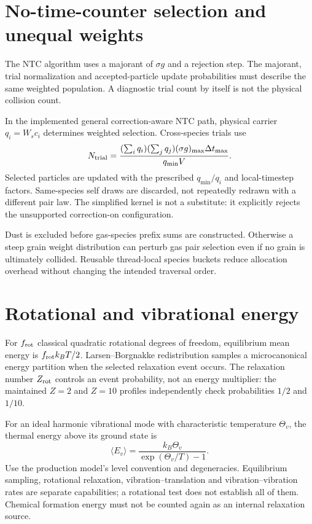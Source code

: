 \section{No-time-counter selection and unequal weights}
The NTC algorithm uses a majorant of $\sigma g$ and a rejection step.
The majorant, trial normalization and accepted-particle update probabilities
must describe the same weighted population. A diagnostic trial count by
itself is not the physical collision count.

In the implemented general correction-aware NTC path, physical carrier
$q_i=W_s c_i$ determines weighted selection. Cross-species trials use
\begin{equation}
N_{\rm trial}=\frac{(\sum_iq_i)(\sum_jq_j)
(\sigma g)_{\max}\Delta t_{\max}}{q_{\min}V}.
\end{equation}
Selected particles are updated with the prescribed $q_{\min}/q_i$ and
local-timestep factors. Same-species self draws are discarded, not repeatedly
redrawn with a different pair law. The simplified kernel is not a substitute:
it explicitly rejects the unsupported correction-on configuration.

Dust is excluded before gas-species prefix sums are constructed. Otherwise a
steep grain weight distribution can perturb gas pair selection even if no
grain is ultimately collided. Reusable thread-local species buckets reduce
allocation overhead without changing the intended traversal order.

\section{Rotational and vibrational energy}
For $f_{\rm rot}$ classical quadratic rotational degrees of freedom, equilibrium
mean energy is $f_{\rm rot}k_BT/2$. Larsen--Borgnakke redistribution samples a
microcanonical energy partition when the selected relaxation event occurs.
The relaxation number $Z_{\rm rot}$ controls an event probability, not an
energy multiplier: the maintained $Z=2$ and $Z=10$ profiles independently
check probabilities $1/2$ and $1/10$.

For an ideal harmonic vibrational mode with characteristic temperature
$\Theta_v$, the thermal energy above its ground state is
\begin{equation}
\langle E_v\rangle=\frac{k_B\Theta_v}{\exp(\Theta_v/T)-1}.
\end{equation}
Use the production model's level convention and degeneracies. Equilibrium
sampling, rotational relaxation, vibration--translation and vibration--vibration
rates are separate capabilities; a rotational test does not establish all of
them. Chemical formation energy must not be counted again as an internal
relaxation source.

